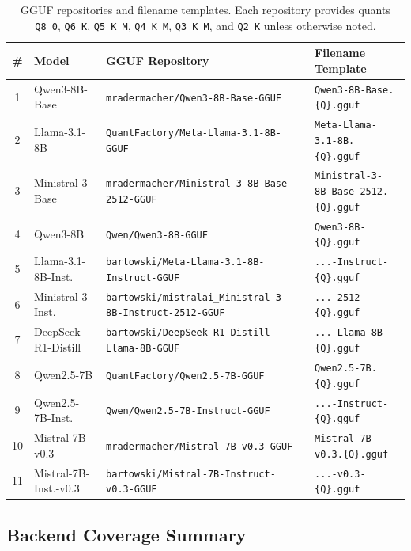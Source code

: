 \begin{table}[h]
\centering
\caption{GGUF repositories and filename templates. Each repository provides quants \texttt{Q8\_0}, \texttt{Q6\_K}, \texttt{Q5\_K\_M}, \texttt{Q4\_K\_M}, \texttt{Q3\_K\_M}, and \texttt{Q2\_K} unless otherwise noted.}
\label{tab:gguf_repos}
\small
\begin{tabular}{@{}clll@{}}
\toprule
\# & Model & GGUF Repository & Filename Template \\
\midrule
1  & Qwen3-8B-Base        & \texttt{mradermacher/Qwen3-8B-Base-GGUF}       & \texttt{Qwen3-8B-Base.\{Q\}.gguf} \\
2  & Llama-3.1-8B         & \texttt{QuantFactory/Meta-Llama-3.1-8B-GGUF}   & \texttt{Meta-Llama-3.1-8B.\{Q\}.gguf} \\
3  & Ministral-3-Base     & \texttt{mradermacher/Ministral-3-8B-Base-2512-GGUF} & \texttt{Ministral-3-8B-Base-2512.\{Q\}.gguf} \\
4  & Qwen3-8B             & \texttt{Qwen/Qwen3-8B-GGUF}                    & \texttt{Qwen3-8B-\{Q\}.gguf} \\
5  & Llama-3.1-8B-Inst.   & \texttt{bartowski/Meta-Llama-3.1-8B-Instruct-GGUF} & \texttt{...-Instruct-\{Q\}.gguf} \\
6  & Ministral-3-Inst.    & \texttt{bartowski/mistralai\_Ministral-3-8B-Instruct-2512-GGUF} & \texttt{...-2512-\{Q\}.gguf} \\
7  & DeepSeek-R1-Distill  & \texttt{bartowski/DeepSeek-R1-Distill-Llama-8B-GGUF} & \texttt{...-Llama-8B-\{Q\}.gguf} \\
8  & Qwen2.5-7B           & \texttt{QuantFactory/Qwen2.5-7B-GGUF}          & \texttt{Qwen2.5-7B.\{Q\}.gguf} \\
9  & Qwen2.5-7B-Inst.     & \texttt{Qwen/Qwen2.5-7B-Instruct-GGUF}         & \texttt{...-Instruct-\{Q\}.gguf} \\
10 & Mistral-7B-v0.3      & \texttt{mradermacher/Mistral-7B-v0.3-GGUF}     & \texttt{Mistral-7B-v0.3.\{Q\}.gguf} \\
11 & Mistral-7B-Inst.-v0.3 & \texttt{bartowski/Mistral-7B-Instruct-v0.3-GGUF} & \texttt{...-v0.3-\{Q\}.gguf} \\
\bottomrule
\end{tabular}
\end{table}


\subsection{Backend Coverage Summary}
\label{app:coverage}

